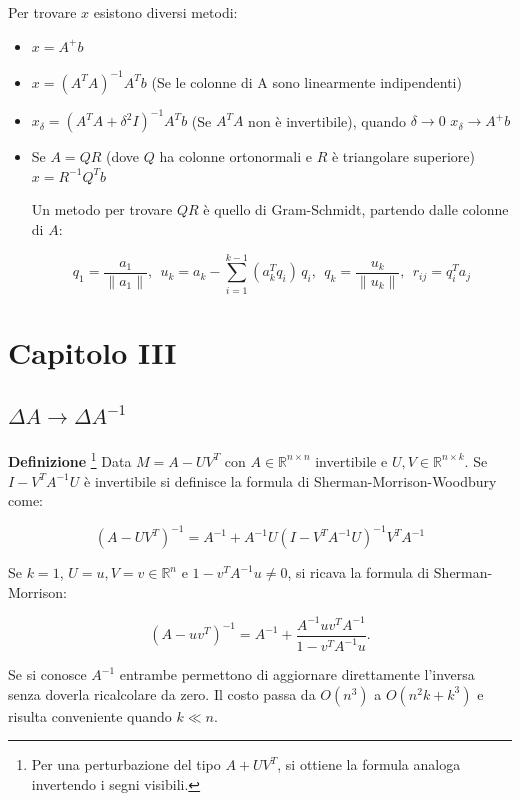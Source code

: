 \documentclass{article}
\newcommand{\df}{\noindent\textbf{Definizione} }
\begin{document}
Per trovare $x$ esistono diversi metodi:
\begin{itemize}
    \item $x=A^+b$
    \item  $x=(A^TA)^{-1}A^Tb$ (Se le colonne di A sono linearmente indipendenti)
    \item $x_\delta=(A^TA+\delta^2I)^{-1}A^Tb$ (Se $A^TA$ non è invertibile), quando $\delta\rightarrow0$ $ x_\delta\rightarrow A^+b$
    \item Se $A=QR$ (dove $Q$ ha colonne ortonormali e $R$ è triangolare superiore) $x=R^{-1}Q^Tb$

    Un metodo per trovare $QR$ è quello di Gram-Schmidt, partendo dalle colonne di $A$:

        \[
            q_1=\frac{a_1}{\|a_1\|}, \ \
            u_k=a_k-\sum_{i=1}^{k-1}(a_k^Tq_i)\,q_i,\ \
            q_k=\frac{u_k}{\|u_k\|},\ \
            r_{ij}=q_i^Ta_j
        \]\newpage
    
\end{itemize}

\section{Capitolo III}

\subsection{\texorpdfstring{$\Delta A\rightarrow \Delta A^{-1}$}{Cambiamenti in A inversa dati da cambiamenti in A}}

\df\footnote{Per una perturbazione del tipo \(A+UV^T\), si ottiene la formula analoga invertendo i segni visibili.} Data $M=A-UV^T$ con \(A\in\mathbb{R}^{n\times n}\) invertibile e
\(U,V\in\mathbb{R}^{n\times k}\). Se \(I-V^TA^{-1}U\) è invertibile si definisce la formula di Sherman-Morrison-Woodbury come:

\[
(A-UV^T)^{-1}
=
A^{-1}
+
A^{-1}U
(I-V^TA^{-1}U)^{-1}
V^TA^{-1}
\]

\vspace{8pt}

Se \(k=1\), \(U=u,V=v\in\mathbb{R}^n\) e \(1-v^TA^{-1}u\neq0\), si ricava la formula di
Sherman-Morrison:

\[
(A-uv^T)^{-1}
=
A^{-1}
+
\frac{A^{-1}uv^TA^{-1}}{1-v^TA^{-1}u}.
\]\newline

Se si conosce $A^{-1}$ entrambe permettono di aggiornare direttamente l'inversa senza doverla ricalcolare da zero. Il costo passa da $O(n^3)$ a $O(n^2k+k^3)$ e risulta conveniente quando $k\ll n$.\newline 
\end{document}
